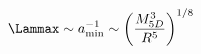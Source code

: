 \begin{equation}
\Lammax \sim a^{-1}_{\rm min} \sim \left(\frac{M_{5D}^3}{R^5}\right)^{1/8}
\end{equation}

